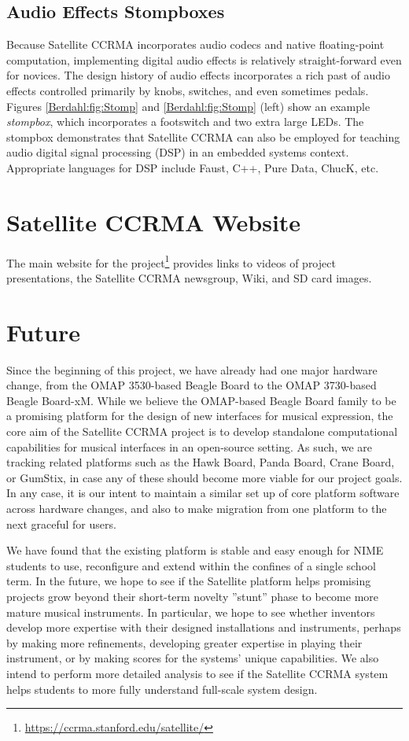\subsection{Audio Effects Stompboxes}
Because Satellite CCRMA incorporates audio codecs and native floating-point computation, implementing digital audio effects is relatively straight-forward even for novices.  The design history of audio effects incorporates a rich past of audio effects controlled primarily by knobs, switches, and even sometimes pedals.  Figures \ref{Berdahl:fig:Stomp} and \ref{Berdahl:fig:Stomp} (left) show an example \emph{stompbox}, which incorporates a footswitch and two extra large LEDs.  The stompbox demonstrates that Satellite CCRMA can also be employed for teaching audio digital signal processing (DSP) in an embedded systems context.  Appropriate languages for DSP include Faust, C++, Pure Data, ChucK, etc.


\section{Satellite CCRMA Website}
The main website for the project\footnote{\url{https://ccrma.stanford.edu/satellite/}} provides links to videos of project presentations, the Satellite CCRMA newsgroup, Wiki, and SD card images.


\section{Future}
Since the beginning of this project, we have already had one major hardware change, from the OMAP 3530-based Beagle Board to the OMAP 3730-based Beagle Board-xM. While we believe the OMAP-based Beagle Board family to be a promising platform for the design of new interfaces for musical expression, the core aim of the Satellite CCRMA project is to develop standalone computational capabilities for musical interfaces in an open-source setting. As such, we are tracking related platforms such as the Hawk Board, Panda Board, Crane Board, or GumStix, in case any of these should become more viable for our project goals. In any case, it is our intent to maintain a similar set up of core platform software across hardware changes, and also to make migration from one platform to the next graceful for users. 

We have found that the existing platform is stable and easy enough for NIME students to use, reconfigure and extend within the confines of a single school term. In the future, we hope to see if the Satellite platform helps promising projects grow beyond their short-term novelty ''stunt'' phase to become more mature musical instruments. In particular,  we hope to see whether inventors develop more expertise with their designed installations and instruments, perhaps by making more refinements, developing greater expertise in playing their instrument, or by making scores for the systems' unique capabilities.  We also intend to perform more detailed analysis to see if the Satellite CCRMA system helps students to more fully understand full-scale system design.

